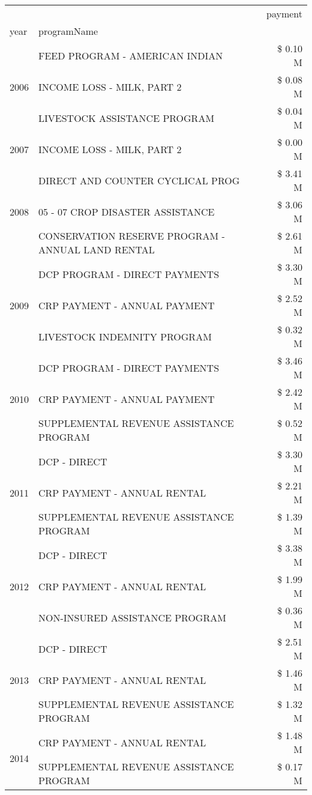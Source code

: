 \begin{tabular}{llr}
\toprule
 &  & payment \\
year & programName &  \\
\midrule
\multirow[t]{3}{*}{2006} & FEED PROGRAM - AMERICAN INDIAN & \$ 0.10 M \\
 & INCOME LOSS - MILK, PART 2 & \$ 0.08 M \\
 & LIVESTOCK ASSISTANCE PROGRAM & \$ 0.04 M \\
\cline{1-3}
2007 & INCOME LOSS - MILK, PART 2 & \$ 0.00 M \\
\cline{1-3}
\multirow[t]{3}{*}{2008} & DIRECT AND COUNTER CYCLICAL PROG & \$ 3.41 M \\
 & 05 - 07 CROP DISASTER ASSISTANCE & \$ 3.06 M \\
 & CONSERVATION RESERVE PROGRAM - ANNUAL LAND RENTAL & \$ 2.61 M \\
\cline{1-3}
\multirow[t]{3}{*}{2009} & DCP PROGRAM - DIRECT PAYMENTS & \$ 3.30 M \\
 & CRP PAYMENT - ANNUAL PAYMENT & \$ 2.52 M \\
 & LIVESTOCK INDEMNITY PROGRAM & \$ 0.32 M \\
\cline{1-3}
\multirow[t]{3}{*}{2010} & DCP PROGRAM - DIRECT PAYMENTS & \$ 3.46 M \\
 & CRP PAYMENT - ANNUAL PAYMENT & \$ 2.42 M \\
 & SUPPLEMENTAL REVENUE ASSISTANCE PROGRAM & \$ 0.52 M \\
\cline{1-3}
\multirow[t]{3}{*}{2011} & DCP - DIRECT & \$ 3.30 M \\
 & CRP PAYMENT - ANNUAL RENTAL & \$ 2.21 M \\
 & SUPPLEMENTAL REVENUE ASSISTANCE PROGRAM & \$ 1.39 M \\
\cline{1-3}
\multirow[t]{3}{*}{2012} & DCP - DIRECT & \$ 3.38 M \\
 & CRP PAYMENT - ANNUAL RENTAL & \$ 1.99 M \\
 & NON-INSURED ASSISTANCE PROGRAM & \$ 0.36 M \\
\cline{1-3}
\multirow[t]{3}{*}{2013} & DCP - DIRECT & \$ 2.51 M \\
 & CRP PAYMENT - ANNUAL RENTAL & \$ 1.46 M \\
 & SUPPLEMENTAL REVENUE ASSISTANCE PROGRAM & \$ 1.32 M \\
\cline{1-3}
\multirow[t]{3}{*}{2014} & CRP PAYMENT - ANNUAL RENTAL & \$ 1.48 M \\
 & SUPPLEMENTAL REVENUE ASSISTANCE PROGRAM & \$ 0.17 M \\

\end{tabular}
